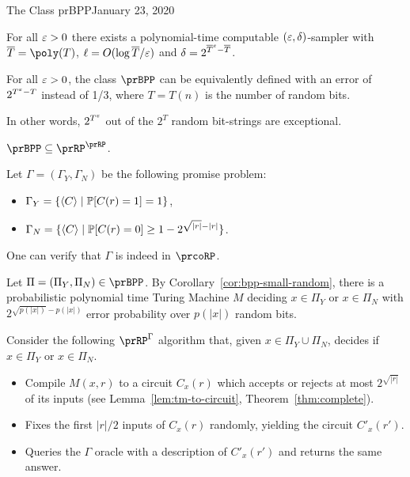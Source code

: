 \begin{lecture}{1}{The Class prBPP}{January 23, 2020}
\begin{theorem}
  For all $\varepsilon > 0$ there exists a polynomial-time computable $(\varepsilon,
  \delta)$-sampler with $\overline{T} = \poly(T)$, $\ell = O(\log
  \overline{T}/\varepsilon)$ and $\delta = 2^{\overline{T}^\varepsilon - \overline{T}}$.
\end{theorem}

\begin{corollary}\label{cor:bpp-small-random}
  For all $\varepsilon > 0$, the class $\prBPP$ can be equivalently defined with an
  error of $2^{T^\varepsilon - T}$ instead of 1/3, where $T = T(n)$ is the number of
  random bits.

  In other words, $2^{T^\varepsilon}$ out of the $2^T$ random bit-strings are exceptional.
\end{corollary}

\begin{theorem}\label{thm:bpp-subset-rprp}
    $\prBPP \subseteq \prRP^\prRP$.
\end{theorem}

\begin{proofsk}
    Let $\Gamma = (\Gamma_Y, \Gamma_N)$ be the following promise problem:
    \begin{itemize}
        \item $\Gamma_Y = \{\langle C \rangle \mid \mathbb{P}[C(r) = 1] = 1\}$,
        \item $\Gamma_N = \{\langle C \rangle \mid \mathbb{P}[C(r) = 0] \geq 1 - 2^{\sqrt{|r|} - |r|}\}$.
    \end{itemize}
    One can verify that $\Gamma$ is indeed in $\prcoRP$.

    Let $\Pi = (\Pi_Y, \Pi_N) \in \prBPP$.
    By Corollary~\ref{cor:bpp-small-random}, there is a probabilistic polynomial time 
    Turing Machine $M$ deciding $x \in \Pi_Y$ or $x \in \Pi_N$ with $2^{\sqrt{p(|x|)} 
    - p(|x|)}$ error probability over $p(|x|)$ random bits.
    
    Consider the following $\prRP^\Gamma$ algorithm that, given $x \in \Pi_Y \cup \Pi_N$, 
    decides if $x \in \Pi_Y$ or $x \in \Pi_N$.
    \begin{itemize}
        \item Compile $M(x,r)$ to a circuit $C_x(r)$ which accepts or rejects at most 
            $2^{\sqrt{|r|}}$ of its inputs (see Lemma~\ref{lem:tm-to-circuit}, 
            Theorem~\ref{thm:complete}).
        \item Fixes the first $|r|/2$ inputs of $C_x(r)$ randomly, yielding the circuit 
            $C'_x(r')$.
        \item Queries the $\Gamma$ oracle with a description of $C'_x(r')$ and returns 
            the same answer.
    \end{itemize}


\end{proofsk}
\end{lecture}
